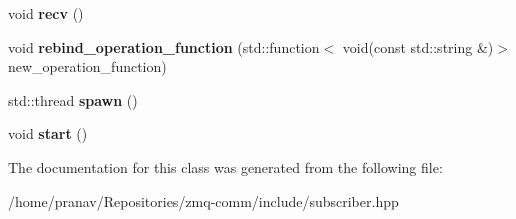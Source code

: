 \begin{DoxyCompactItemize}
\item 
void {\bfseries recv} ()\hypertarget{classSubscriber_a9f11c50282c4c6b3d0f13e7509e12cf4}{}\label{classSubscriber_a9f11c50282c4c6b3d0f13e7509e12cf4}

\item 
void {\bfseries rebind\+\_\+operation\+\_\+function} (std\+::function$<$ void(const std\+::string \&)$>$ new\+\_\+operation\+\_\+function)\hypertarget{classSubscriber_accb8f931d762a94aee12f2c5f8b892c7}{}\label{classSubscriber_accb8f931d762a94aee12f2c5f8b892c7}

\item 
std\+::thread {\bfseries spawn} ()\hypertarget{classSubscriber_a67e14a76406e393f4448f18558cb93f8}{}\label{classSubscriber_a67e14a76406e393f4448f18558cb93f8}

\item 
void {\bfseries start} ()\hypertarget{classSubscriber_a9299f928c18fbdb444f624be47a7cf69}{}\label{classSubscriber_a9299f928c18fbdb444f624be47a7cf69}

\end{DoxyCompactItemize}


The documentation for this class was generated from the following file\+:\begin{DoxyCompactItemize}
\item 
/home/pranav/\+Repositories/zmq-\/comm/include/subscriber.\+hpp\end{DoxyCompactItemize}
